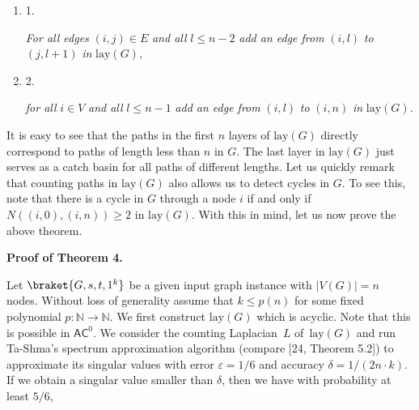 \documentclass[10pt,a4paper]{article}
\begin{document}
\begin{enumerate}


\item[] 
1. 


\emph{For all edges }$(i,j)\in E$\emph{ and all }$l\leq n-2$\emph{ add an edge from }$(i,l)$\emph{ to }$(j,l+1)$\emph{ in }$\mathrm{lay}(G)$\emph{,}\par





\item[] 
2. 


\emph{for all }$i\in V$\emph{ and all }$l\leq n-1$\emph{ add an edge from }$(i,l)$\emph{ to }$(i,n)$\emph{ in }$\mathrm{lay}(G)$\emph{.}\par





\end{enumerate}






It is easy to see that the paths in the first $n$ layers of $\mathrm{lay}(G)$ directly correspond to paths of length less than $n$ in $G$.
The last layer in $\mathrm{lay}(G)$ just serves as a catch basin for all paths of different lengths.
Let us quickly remark that counting paths in $\mathrm{lay}(G)$ also allows us to detect cycles in $G$. To see this, note that there is a cycle in $G$ through a node $i$ if and only if $N((i,0),(i,n))\geq 2$ in $\mathrm{lay}(G)$.
With this in mind, let us now prove the above theorem.\par




\par\medskip\noindent\textbf{Proof of Theorem 4.}\par




Let $\braket{G,s,t,1^{k}}$ be a given input graph instance with $|V(G)|=n$ nodes.
Without loss of generality assume that $k\leq p(n)$ for some fixed polynomial $p:\mathbb{N}\rightarrow\mathbb{N}$.
We first construct $\mathrm{lay}(G)$ which is acyclic. Note that this is possible in $\mathsf{AC}^{0}$.
We consider the counting Laplacian $L$ of $\mathrm{lay}(G)$ and run Ta-Shma’s spectrum approximation algorithm (compare [24, Theorem 5.2]) to approximate its singular values with error $\varepsilon=1/6$ and accuracy $\delta=1/(2n\cdot k)$.
If we obtain a singular value smaller than $\delta$, then we have with probability at least $5/6$,\par
\end{document}
